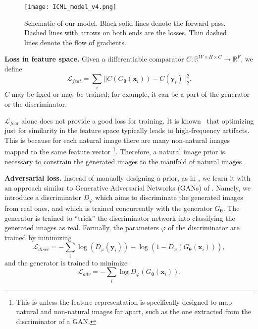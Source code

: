 \documentclass{article}
\newcommand{\oR}{\mathbb{R}}
\newcommand{\inp}{\mathbf{x}}
\newcommand{\targ}{\mathbf{y}}
\newcommand{\weights}{\mathbf{\theta}}
\newcommand{\gen}{G_\weights}
\newcommand{\comp}{C}
\newcommand{\discr}{D_\varphi}
\newcommand{\loss}{\mathcal{L}}
\newcommand{\featloss}{\loss_{feat}}
\newcommand{\discrloss}{\loss_{adv}}
\newcommand{\imgspace}{\oR^{W \times H \times C}}
\newcommand{\featspace}{\oR^F}
\begin{document}
\begin{figure}
\begin{center}
\texttt{[image: ICML\_model\_v4.png]}
   \caption{Schematic of our model. Black solid lines denote the forward pass. 
   Dashed lines with arrows on both ends are the losses. 
   Thin dashed lines denote the flow of gradients.}
   \label{fig:model}
\end{center}
\end{figure}

\textbf{Loss in feature space.} 
Given a differentiable comparator $\comp \colon \imgspace \to \featspace$, we define
\begin{equation}
 \featloss = \sum\limits_{i} || \comp(\gen(\inp_i)) - \comp(\targ_i) ||_2^2.
\end{equation}
$\comp$ may be fixed or may be trained; for example, it can be a part of the generator or the discriminator.

$\featloss$ alone does not provide a good loss for training.
It is known~\citep{Mahendran_CVPR2015} that optimizing just for similarity in the feature space typically leads to high-frequency artifacts.
This is because 
for each natural image there are many non-natural images mapped to the same feature vector
\footnote{This is unless the feature representation is specifically designed to map natural and non-natural images far apart, such as the one extracted from the discriminator of a GAN.}.
Therefore, a natural image prior is necessary to constrain the generated images to the manifold of natural images.

\textbf{Adversarial loss.} Instead of manually designing a prior, as in \citet{Mahendran_CVPR2015}, we learn it with an approach similar to Generative Adversarial Networks (GANs) of \citet{Goodfellow_NIPS2014}.
Namely, we introduce a discriminator $\discr$ which aims to discriminate the generated images from real ones, and which is trained concurrently with the generator $\gen$.
The generator is trained to ``trick'' the discriminator network into classifying the generated images as real.
Formally, the parameters $\varphi$ of the discriminator are trained by minimizing
\begin{equation} \label{eq:discrloss_discr}
 \mathcal{L}_{discr} = - \sum\limits_{i} \log (\discr(\targ_i)) + \log (1 - \discr(\gen(\inp_i))), 
\end{equation}
and the generator is trained to minimize
\begin{equation} \label{eq:discrloss_gen}
 \discrloss = - \sum\limits_{i} \log \discr(\gen(\inp_i)).
\end{equation}
\end{document}
